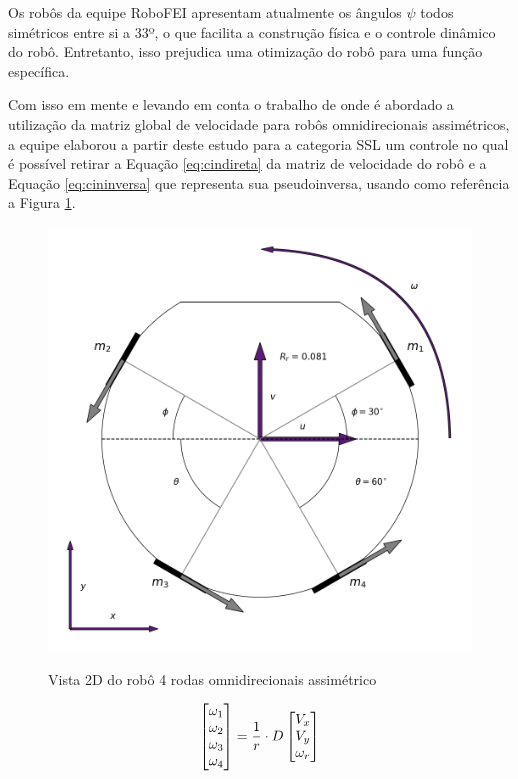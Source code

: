 \documentclass[deposito, acronym, symbols]{fei}
\begin{document}
Os robôs da equipe RoboFEI apresentam atualmente os ângulos $\psi$  todos simétricos entre si a 33º, o que facilita a construção física e o controle dinâmico do robô. Entretanto, isso prejudica uma otimização do robô para uma função específica. 

Com isso em mente e levando em conta o trabalho de \textcite{rojas2005omnidirectional} onde é abordado a utilização da matriz global de velocidade para robôs omnidirecionais assimétricos, a equipe \textcite{Twente} elaborou a partir deste estudo para a categoria SSL um controle no qual é possível retirar a Equação \ref{eq:cindireta} da matriz de velocidade do robô e a Equação \ref{eq:cininversa} que representa sua pseudoinversa, usando como referência a Figura \ref{fig:topview}.


\begin{figure}[!htb]
    \centering
    \caption{Vista 2D do robô 4 rodas omnidirecionais assimétrico}
    \includegraphics[scale=0.65]{Imagens/topview.png}
    \label{fig:topview}
\end{figure}



\begin{equation} \label{eq:cindireta_1}
\centering  
\begin{bmatrix}\omega_1\\\omega_2\\\omega_3\\\omega_4\end{bmatrix} = \frac{1}{r} \cdot D
   \begin{bmatrix}V_x\\V_y\\\omega_r\end{bmatrix}  
\end{equation}
\end{document}
